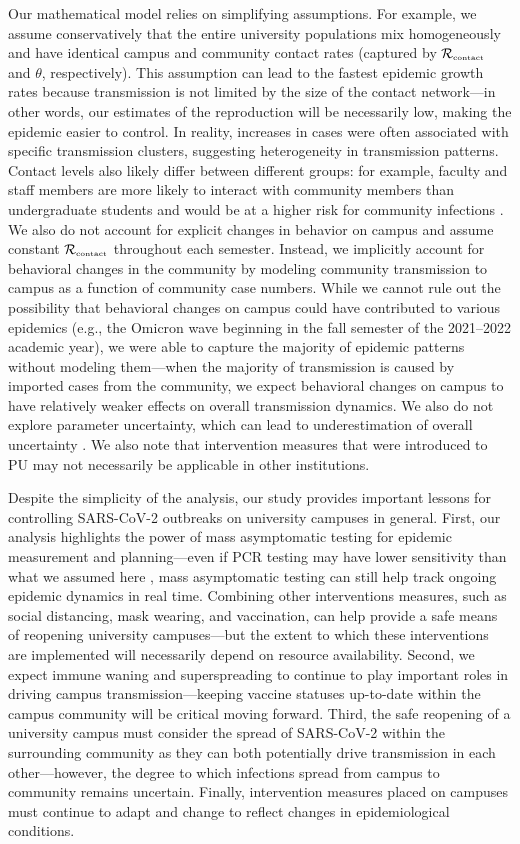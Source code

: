 \documentclass[12pt]{article}
\newcommand{\Rx}[1]{\ensuremath{{\mathcal R}_{#1}}}
\newcommand{\Rc}{\Rx{\textrm{\tiny{contact}}}}
\begin{document}
Our mathematical model relies on simplifying assumptions.
For example, we assume conservatively that the entire university populations mix homogeneously and have identical campus and community contact rates (captured by $\Rc$ and $\theta$, respectively).
This assumption can lead to the fastest epidemic growth rates because transmission is not limited by the size of the contact network---in other words, our estimates of the reproduction will be necessarily low, making the epidemic easier to control.
In reality, increases in cases were often associated with specific transmission clusters, suggesting heterogeneity in transmission patterns.
Contact levels also likely differ between different groups:
for example, faculty and staff members are more likely to interact with community members than undergraduate students and would be at a higher risk for community infections \citep{frazier2022modeling}.
We also do not account for explicit changes in behavior on campus and assume constant $\Rc$ throughout each semester.
Instead, we implicitly account for behavioral changes in the community by modeling community transmission to campus as a function of community case numbers.
While we cannot rule out the possibility that behavioral changes on campus could have contributed to various epidemics (e.g., the Omicron wave beginning in the fall semester of the 2021--2022 academic year), we were able to capture the majority of epidemic patterns without modeling them---when the majority of transmission is caused by imported cases from the community, we expect behavioral changes on campus to have relatively weaker effects on overall transmission dynamics.
We also do not explore parameter uncertainty, which can lead to underestimation of overall uncertainty \citep{elderd2006uncertainty}. 
We also note that intervention measures that were introduced to PU may not necessarily be applicable in other institutions.

Despite the simplicity of the analysis, our study provides important lessons for controlling SARS-CoV-2 outbreaks on university campuses in general.
First, our analysis highlights the power of mass asymptomatic testing for epidemic measurement and planning---even if PCR testing may have lower sensitivity than what we assumed here \citep{hellewell2021estimating}, mass asymptomatic testing can still help track ongoing epidemic dynamics in real time.
Combining other interventions measures, such as social distancing, mask wearing, and vaccination, can help provide a safe means of reopening university campuses---but the extent to which these interventions are implemented will necessarily depend on resource availability.
Second, we expect immune waning and superspreading to continue to play important roles in driving campus transmission---keeping vaccine statuses up-to-date within the campus community will be critical moving forward.
Third, the safe reopening of a university campus must consider the spread of SARS-CoV-2 within the surrounding community as they can both potentially drive transmission in each other---however, the degree to which infections spread from campus to community remains uncertain.
Finally, intervention measures placed on campuses must continue to adapt and change to reflect changes in epidemiological conditions.
\end{document}
